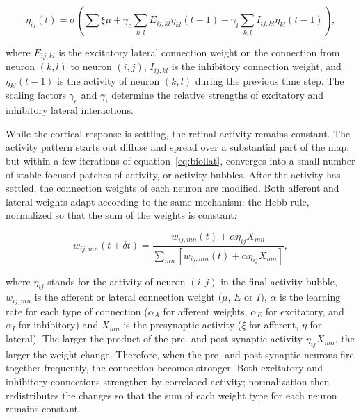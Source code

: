 \documentclass[10pt]{article}   %
\begin{document}
\begin{htmlonly}
  \begin{equation}
    \label{eq:biollat}
    \eta_{ij}(t) = \sigma \left(   \sum \xi \mu +
      \gamma_e \sum_{k,l} E_{ij,kl} \eta_{kl}(t-1) -
      \gamma_i \sum_{k,l} I_{ij,kl} \eta_{kl}(t-1) \right) ,
  \end{equation}
\end{htmlonly}

where $E_{ij,kl}$ is the excitatory lateral connection weight on the
connection from neuron $(k,l)$ to neuron $(i,j)$, $I_{ij,kl}$ is the
inhibitory connection weight, and $\eta_{kl}(t-1)$ is the activity of
neuron $(k,l)$ during the previous time step.  
The scaling factors $\gamma_e$ and $\gamma_i$ determine 
the relative strengths of excitatory and inhibitory lateral
interactions.  

While the cortical response is settling, the retinal
activity remains constant.
The activity pattern starts out diffuse and spread over a substantial
part of the map, but within a few iterations of
equation~\ref{eq:biollat}, converges into a small number of stable
focused patches of activity, or activity bubbles.  
After the activity has settled, the connection weights of each neuron
are modified. Both afferent and lateral weights adapt according to the
same mechanism: the Hebb rule, normalized so that the sum of the
weights is constant:

\begin{equation}
  \label{eq:firstdw}
  w_{ij,mn}(t+\delta t)=\frac{ w_{ij,mn}(t) + \alpha \eta_{ij} X_{mn}}
  {\sum_{mn} \left[ w_{ij,mn}(t) + \alpha \eta_{ij} X_{mn} \right]},
\end{equation}

where $\eta_{ij}$ stands for the activity of neuron $(i,j)$ in the
final activity bubble, $w_{ij,mn}$ is the afferent or lateral
connection weight ($\mu$, $E$ or $I$), $\alpha$ is the learning rate
for each type of connection ($\alpha_A$ for afferent weights,
$\alpha_E$ for excitatory, and $\alpha_I$ for inhibitory) and $X_{mn}$
is the presynaptic activity ($\xi$ for afferent, $\eta$ for lateral).
The larger the product of the pre- 
and post-synaptic activity $\eta_{ij} X_{mn}$, the larger the weight
change. Therefore, when the pre- and post-synaptic neurons fire
together frequently, the connection becomes stronger.  Both excitatory
and inhibitory connections strengthen by correlated activity;
normalization then redistributes the changes so that the sum of each
weight type for each neuron remains constant.  
\end{document}
